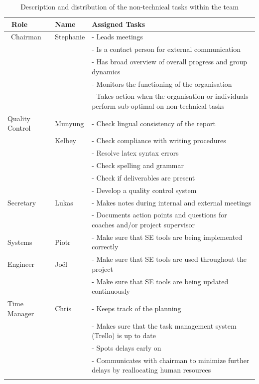 \begin{table}[H]
    \centering
    \caption{Description and distribution of the non-technical tasks within the team}
    \label{tab:nttdiv}
    \begin{tabular}{p{2.7cm}lp{10cm}}
        \toprule \
        \textbf{Role}      & \textbf{Name}     & \textbf{Assigned Tasks} \\
        \toprule \
        Chairman & Stephanie & - Leads meetings \\
         &  & - Is a contact person for external communication \\
         &  & - Has broad overview of overall progress and group dynamics \\
         &  & - Monitors the functioning of the organisation \\
         &  & - Takes action when the organisation or individuals perform sub-optimal on non-technical tasks \\ \hdashline
        Quality Control & Munyung & - Check lingual consistency of the report \\
                        & Kelbey & - Check compliance with writing procedures \\
         &  & - Resolve latex syntax errors \\
         &  & - Check spelling and grammar \\
         &  & - Check if deliverables are present \\ 
         &  & - Develop a quality control system \\ \hdashline
        Secretary & Lukas & - Makes notes during internal and external meetings \\
         &  & - Documents action points and questions for coaches and/or project supervisor \\ \hdashline
        Systems & Piotr & - Make sure that SE tools are being implemented correctly \\
        Engineer         &  Joël & - Make sure that SE tools are used throughout the project \\
        &  & - Make sure that SE tools are being updated continuously \\ \hdashline
        Time Manager & Chris & - Keeps track of the planning \\
                     &       & - Makes sure that the task management system (Trello) is up to date \\
         &  & - Spots delays early on \\
         &  & - Communicates with chairman to minimize further delays by reallocating human resources \\ \hdashline

\end{tabular}
\end{table}
